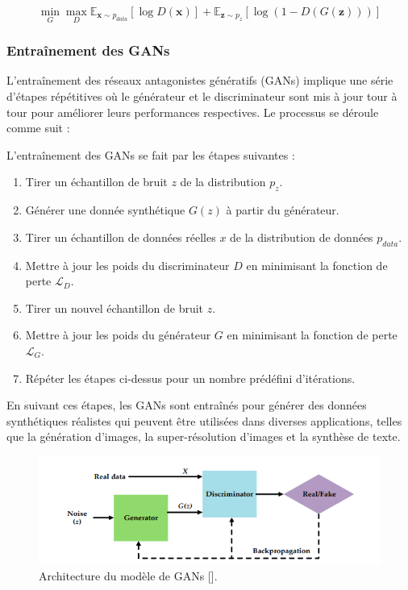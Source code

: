 \begin{equation}
	\min_G \max_D \mathbb{E}_{\mathbf{x} \sim p_{data}}[\log D(\mathbf{x})] + \mathbb{E}_{\mathbf{z} \sim p_z}[\log(1 - D(G(\mathbf{z})))]
	\label{equ:prob_gan}
\end{equation}

\subsubsection{Entraînement des GANs}

L’entraînement des réseaux antagonistes génératifs (GANs) implique une série
d'étapes répétitives où le générateur et le discriminateur sont mis à jour tour
à tour pour améliorer leurs performances respectives. Le processus se déroule
comme suit :

L'entraînement des GANs se fait par les étapes suivantes :
\begin{enumerate}
	\item Tirer un échantillon de bruit \( z \) de la distribution \( p_z \).
	\item Générer une donnée synthétique \( G(z) \) à partir du générateur.
	\item Tirer un échantillon de données réelles \( x \) de la distribution de données
	      \( p_{data} \).
	\item Mettre à jour les poids du discriminateur \( D \) en minimisant la fonction de
	      perte \( \mathcal{L}_D \).
	\item Tirer un nouvel échantillon de bruit \( z \).
	\item Mettre à jour les poids du générateur \( G \) en minimisant la fonction de
	      perte \( \mathcal{L}_G \).
	\item Répéter les étapes ci-dessus pour un nombre prédéfini d'itérations.
\end{enumerate}

En suivant ces étapes, les GANs sont entraînés pour générer des données
synthétiques réalistes qui peuvent être utilisées dans diverses applications,
telles que la génération d'images, la super-résolution d'images et la synthèse
de texte.

\begin{figure}[hbt!]
	\centering
	\includegraphics[width=12cm]{images_pfe/gan_1.png}
	\caption{Architecture du modèle de GANs [\cite{feng_feng_chen_cao_zhang_jiao_yu_2020}].}
	\label{fig:gan}
\end{figure}
\FloatBarrier

